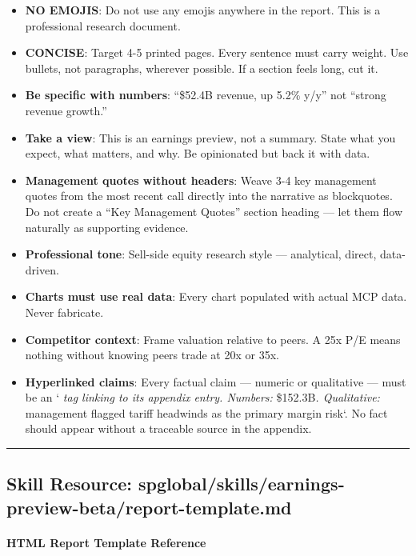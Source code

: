 \documentclass[11pt]{article}
\begin{document}
\begin{itemize}[leftmargin=*,itemsep=2pt,topsep=2pt]
\item {} \textbf{NO EMOJIS}: Do not use any emojis anywhere in the report. This is a professional research document.
\item {} \textbf{CONCISE}: Target 4-5 printed pages. Every sentence must carry weight. Use bullets, not paragraphs, wherever possible. If a section feels long, cut it.
\item {} \textbf{Be specific with numbers}: ``\$52.4B revenue, up 5.2\% y/y'' not ``strong revenue growth.''
\item {} \textbf{Take a view}: This is an earnings preview, not a summary. State what you expect, what matters, and why. Be opinionated but back it with data.
\item {} \textbf{Management quotes without headers}: Weave 3-4 key management quotes from the most recent call directly into the narrative as blockquotes. Do not create a ``Key Management Quotes'' section heading — let them flow naturally as supporting evidence.
\item {} \textbf{Professional tone}: Sell-side equity research style — analytical, direct, data-driven.
\item {} \textbf{Charts must use real data}: Every chart populated with actual MCP data. Never fabricate.
\item {} \textbf{Competitor context}: Frame valuation relative to peers. A 25x P/E means nothing without knowing peers trade at 20x or 35x.
\item {} \textbf{Hyperlinked claims}: Every factual claim — numeric or qualitative — must be an `\emph{ tag linking to its appendix entry. Numbers: }\$152.3B\emph{. Qualitative: }management flagged tariff headwinds as the primary margin risk`. No fact should appear without a traceable source in the appendix.
\end{itemize}

\vspace{0.8em}\hrule\vspace{0.8em}

\subsection{Skill Resource: spglobal/skills/earnings-preview-beta/report-template.md}\label{file:spglobal-skills-earnings-preview-beta-report-template.md}

\paragraph{HTML Report Template Reference}\mbox{}\par
\end{document}
